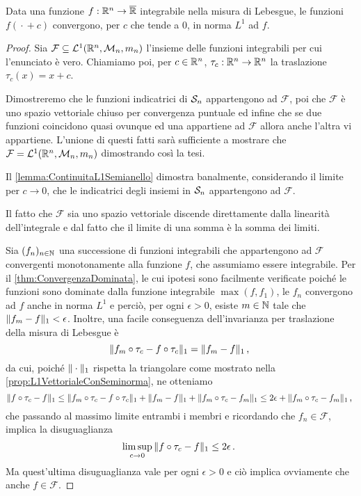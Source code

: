 \begin{proposition}[Continuità $L^1$]\label{prop:ContinuitaL1}
	Data una funzione $f:\R^n\to\Rbar$ integrabile nella misura di Lebesgue, le funzioni $f({}\cdot{}+c)$ convergono, per $c$ che tende a $0$, in norma $L^1$ ad $f$.
\end{proposition}
\begin{proof}
	Sia $\mathcal F\subseteq \L(\R^n,\M_n,m_n)$ l'insieme delle funzioni integrabili per cui l'enunciato è vero.
	Chiamiamo poi, per $c\in\R^n$, $\tau_c:\R^n\to\R^n$ la traslazione $\tau_c(x)=x+c$.
	
	Dimostreremo che le funzioni indicatrici di $\S_n$ appartengono ad $\mathcal F$, poi che $\mathcal F$ è uno spazio vettoriale chiuso per convergenza puntuale ed infine che se due funzioni coincidono quasi ovunque ed una appartiene ad $\mathcal F$ allora anche l'altra vi appartiene. 
	L'unione di questi fatti sarà sufficiente a mostrare che $\mathcal F=\L(\R^n,\M_n,m_n)$ dimostrando così la tesi.
	
	Il \cref{lemma:ContinuitaL1Semianello} dimostra banalmente, considerando il limite per $c\to 0$, che le indicatrici degli insiemi in $\S_n$ appartengono ad $\mathcal F$.
	
	Il fatto che $\mathcal F$ sia uno spazio vettoriale discende direttamente dalla linearità dell'integrale e dal fatto che il limite di una somma è la somma dei limiti.
	
	Sia $(f_n)_{n\in\N}$ una successione di funzioni integrabili che appartengono ad $\mathcal F$ convergenti monotonamente alla funzione $f$, che assumiamo essere integrabile.
	Per il \cref{thm:ConvergenzaDominata}, le cui ipotesi sono facilmente verificate poiché le funzioni sono dominate dalla funzione integrabile $\max(f,f_1)$, le $f_n$ convergono ad $f$ anche in norma $L^1$ e perciò, per ogni $\epsilon>0$, esiste $m\in\N$ tale che $\LNorm{f_m-f}<\epsilon$. 
	Inoltre, una facile conseguenza dell'invarianza per traslazione della misura di Lebesgue è 
	\begin{equation*}
		\LNorm{f_m\circ\tau_c-f\circ\tau_c}=\LNorm{f_m-f} \virgola
	\end{equation*}
	da cui, poiché $\LNorm{{}\cdot{}}$ rispetta la triangolare come mostrato nella \cref{prop:L1VettorialeConSeminorma}, ne otteniamo
	\begin{equation*}
		\LNorm{f\circ\tau_c-f}\le \LNorm{f_m\circ\tau_c-f\circ\tau_c}+\LNorm{f_m-f}+\LNorm{f_m\circ\tau_c-f_m} \le 2\epsilon+\LNorm{f_m\circ\tau_c-f_m}\virgola
	\end{equation*}
	che passando al massimo limite entrambi i membri e ricordando che $f_n\in\mathcal F$, implica la disuguaglianza
	\begin{equation*}
		\limsup_{c\to 0} \LNorm{f\circ\tau_c-f} \le 2\epsilon \punto
	\end{equation*}
	Ma quest'ultima disuguaglianza vale per ogni $\epsilon>0$ e ciò implica ovviamente che anche $f\in\mathcal F$.
	

\end{proof}
